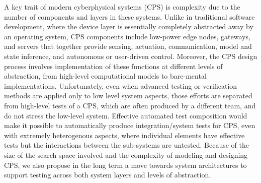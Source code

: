 A key trait of modern cyberphysical systems (CPS) is complexity due to the number of components and layers in these systems.  Unlike in traditional software development, where the device layer is essentially completely abstracted away by an operating system, CPS components include low-power edge nodes, gateways, and servers that together provide sensing, actuation, communication, model and state inference, and autonomous or user-driven control.  Moreover, the CPS design process involves implementation of these functions at different levels of abstraction, from high-level computational models to bare-mental implementations. Unfortunately, even when advanced testing or verification methods are applied only to low level system aspects, those efforts are separated from high-level tests of a CPS, which are often produced by a different team, and do not stress the low-level system.  Effective automated test composition would make it possible to automatically produce integration/system tests for CPS, even with extremely heterogenous aspects, where individual elements have effective tests but the interactions between the sub-systems are untested.  Because of the size of the search space involved and the complexity of modeling and designing CPS, we also propose in the long term a move towards system architectures to support testing across both system layers and levels of abstraction.
